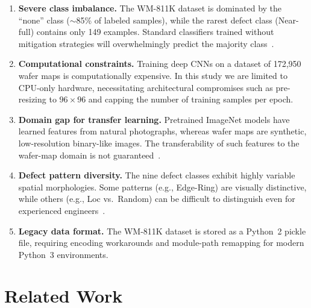\documentclass[conference]{IEEEtran}
\begin{document}
\begin{enumerate}
    \item \textbf{Severe class imbalance.} The WM-811K dataset is dominated by
          the ``none'' class ($\sim$85\% of labeled samples), while the rarest
          defect class (Near-full) contains only 149 examples. Standard
          classifiers trained without mitigation strategies will overwhelmingly
          predict the majority class~\cite{he2009}.

    \item \textbf{Computational constraints.} Training deep CNNs on a dataset
          of 172{,}950 wafer maps is computationally expensive. In this study
          we are limited to CPU-only hardware, necessitating architectural
          compromises such as pre-resizing to $96 \times 96$ and capping the
          number of training samples per epoch.

    \item \textbf{Domain gap for transfer learning.} Pretrained ImageNet
          models have learned features from natural photographs, whereas wafer
          maps are synthetic, low-resolution binary-like images. The
          transferability of such features to the wafer-map domain is not
          guaranteed~\cite{yosinski2014}.

    \item \textbf{Defect pattern diversity.} The nine defect classes exhibit
          highly variable spatial morphologies. Some patterns (e.g., Edge-Ring)
          are visually distinctive, while others (e.g., Loc vs.\ Random) can be
          difficult to distinguish even for experienced
          engineers~\cite{chen2023}.

    \item \textbf{Legacy data format.} The WM-811K dataset is stored as a
          Python~2 pickle file, requiring encoding workarounds and module-path
          remapping for modern Python~3 environments.
\end{enumerate}

\section{Related Work}
\label{sec:related}
\end{document}
